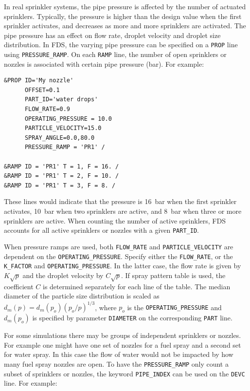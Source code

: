 \documentclass[11pt]{book}
\newcommand{\ct}{\tt\small}
\begin{document}
In real sprinkler systems, the pipe pressure is affected by the number of actuated sprinklers. Typically,
the pressure is higher than the design value when the first sprinkler activates, and decreases as more and more sprinklers are activated. The pipe pressure has an effect on flow rate,
droplet velocity and droplet size distribution. In FDS, the varying pipe pressure can be specified on a {\ct PROP} line using {\ct PRESSURE\_RAMP}. On each {\ct RAMP} line,
the number of open sprinklers or nozzles is associated with certain pipe pressure (bar). For example:

\footnotesize
\begin{verbatim}
&PROP ID='My nozzle'
      OFFSET=0.1
      PART_ID='water drops'
      FLOW_RATE=0.9
      OPERATING_PRESSURE = 10.0
      PARTICLE_VELOCITY=15.0
      SPRAY_ANGLE=0.0,80.0
      PRESSURE_RAMP = 'PR1' /

&RAMP ID = 'PR1' T = 1, F = 16. /
&RAMP ID = 'PR1' T = 2, F = 10. /
&RAMP ID = 'PR1' T = 3, F = 8. /
\end{verbatim}
\normalsize
\noindent
These lines would indicate that the pressure is 16~bar when the first sprinkler activates, 10~bar when two sprinklers are active, and 8~bar when three or more sprinklers are active. When counting the number of active sprinklers, FDS accounts for all active sprinklers or nozzles with a given {\ct PART\_ID}.

When pressure ramps are used, both {\ct FLOW\_RATE} and {\ct PARTICLE\_VELOCITY} are dependent on the
{\ct OPERATING\_PRESSURE}. Specify either the {\ct FLOW\_RATE}, or the
{\ct K\_FACTOR} and {\ct OPERATING\_PRESSURE}. In the latter case, the flow rate is given by $K \sqrt{p}$ and the droplet velocity
by $C \sqrt{p}$.  If spray pattern table is used, the coefficient $C$ is determined separately for each line of the
table. The median diameter of the particle size distribution is scaled as
$d_m(p) = d_m(p_o)(p_o/p)^{1/3}$, where $p_o$ is the {\ct OPERATING\_PRESSURE}
and $d_m(p_o)$ is specified by parameter {\ct DIAMETER} on the corresponding {\ct PART} line.

For some simulations there may be groups of independent sprinklers or nozzles.  For example one might have one set of nozzles for a fuel spray and a second set for water spray.  In this case the flow of water would not be impacted by how many fuel spray nozzles are open.  To have the {\ct PRESSURE\_RAMP} only count a subset of sprinklers or nozzles, the keyword {\ct PIPE\_INDEX} can be used on the {\ct DEVC} line. For example:
\end{document}
